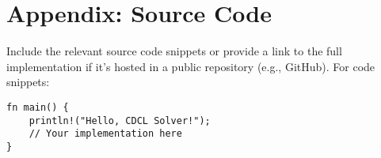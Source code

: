 \documentclass[a4paper,12pt]{article}
\begin{document}
\newpage
\appendix
\section{Appendix: Source Code}
\label{sec:appendix}
Include the relevant source code snippets or provide a link to the full implementation if it's hosted in a public repository (e.g., GitHub). For code snippets:
\begin{verbatim}
fn main() {
    println!("Hello, CDCL Solver!");
    // Your implementation here
}
\end{verbatim}
\end{document}
